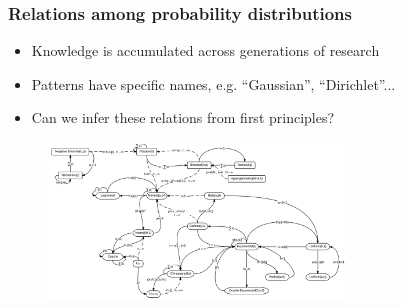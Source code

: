 \documentclass{beamer}
\begin{document}
    \begin{frame}
        \frametitle{Relations among probability distributions}
        \begin{itemize}
            \item Knowledge is accumulated across generations of research
            \item Patterns have specific names, e.g. ``Gaussian'', ``Dirichlet''...
            \item Can we infer these relations from first principles?
        \end{itemize}
        \begin{figure}[H]
            \centering
            \includegraphics[width=0.7\textwidth]{../clipart/distribution_relations.jpeg}
        \end{figure}
    \end{frame}
\end{document}
